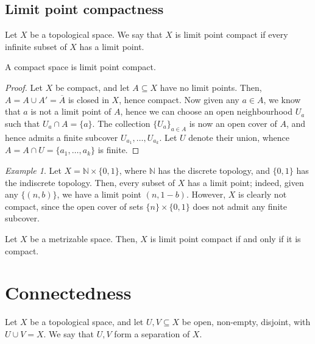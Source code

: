 \documentclass[11pt]{article}
\newcommand{\N}{\mathbb{N}}
\theoremstyle{definition}
\theoremstyle{remark}
\newtheorem*{example}{Example}
\numberwithin{equation}{section}
\begin{document}
    \subsection{Limit point compactness}

    \begin{definition}
        Let $X$ be a topological space. We say that $X$ is limit point compact if
        every infinite subset of $X$ has a limit point.
    \end{definition}

    \begin{lemma}
        A compact space is limit point compact.
    \end{lemma}
    \begin{proof}
        Let $X$ be compact, and let $A \subseteq X$ have no limit points. Then, $A =
        A \cup A' = \overline{A}$ is closed in $X$, hence compact. Now given any $a
        \in A$, we know that $a$ is not a limit point of $A$, hence we can choose an
        open neighbourhood $U_a$ such that $U_a \cap A = \{a\}$. The collection
        $\{U_a\}_{a \in A}$ is now an open cover of $A$, and hence admits a finite
        subcover $U_{a_1}, \dots, U_{a_k}$. Let $U$ denote their union, whence $A = A
        \cap U = \{a_1, \dots, a_k\}$ is finite.
    \end{proof}
    \begin{example}
        Let $X = \N \times \{0, 1\}$, where $\N$ has the discrete topology, and $\{0,
        1\}$ has the indiscrete topology. Then, every subset of $X$ has a limit
        point; indeed, given any $\{(n, b)\}$, we have a limit point $(n, 1 - b)$.
        However, $X$ is clearly not compact, since the open cover of sets
        $\{n\}\times \{0, 1\}$ does not admit any finite subcover.
    \end{example}

    \begin{theorem}
        Let $X$ be a metrizable space. Then, $X$ is limit point compact if and only
        if it is compact.
    \end{theorem}


    \section{Connectedness}
    
    \begin{definition}
        Let $X$ be a topological space, and let $U, V \subseteq X$ be open,
        non-empty, disjoint, with $U \cup V = X$. We say that $U, V$ form a
        separation of $X$.
    \end{definition}
\end{document}
